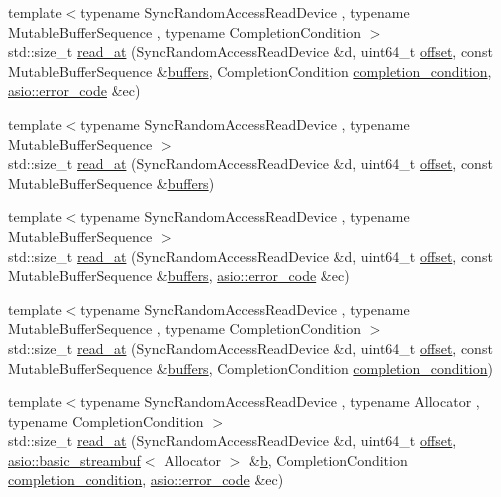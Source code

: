\begin{DoxyCompactItemize}
{\footnotesize template$<$typename Sync\+Random\+Access\+Read\+Device , typename Mutable\+Buffer\+Sequence , typename Completion\+Condition $>$ }\\std\+::size\+\_\+t \hyperlink{group__read__at_ga88604242259da9fb0bacf3c4f0cc0002}{read\+\_\+at} (Sync\+Random\+Access\+Read\+Device \&d, uint64\+\_\+t \hyperlink{group__async__read__at_ga8dcdb41a4adfd6fe5322b5dd666d9f29}{offset}, const Mutable\+Buffer\+Sequence \&\hyperlink{group__async__read_ga54dede45c3175148a77fe6635222c47d}{buffers}, Completion\+Condition \hyperlink{group__async__read_gae2e215d5013596cc2b385bb6c13fa518}{completion\+\_\+condition}, \hyperlink{classasio_1_1error__code}{asio\+::error\+\_\+code} \&ec)
\item 
{\footnotesize template$<$typename Sync\+Random\+Access\+Read\+Device , typename Mutable\+Buffer\+Sequence $>$ }\\std\+::size\+\_\+t \hyperlink{group__read__at_ga4ef7a26ff401494d673ad462a3f3f5c0}{read\+\_\+at} (Sync\+Random\+Access\+Read\+Device \&d, uint64\+\_\+t \hyperlink{group__async__read__at_ga8dcdb41a4adfd6fe5322b5dd666d9f29}{offset}, const Mutable\+Buffer\+Sequence \&\hyperlink{group__async__read_ga54dede45c3175148a77fe6635222c47d}{buffers})
\item 
{\footnotesize template$<$typename Sync\+Random\+Access\+Read\+Device , typename Mutable\+Buffer\+Sequence $>$ }\\std\+::size\+\_\+t \hyperlink{group__read__at_ga6587e766e26325457154a5dac2a0b785}{read\+\_\+at} (Sync\+Random\+Access\+Read\+Device \&d, uint64\+\_\+t \hyperlink{group__async__read__at_ga8dcdb41a4adfd6fe5322b5dd666d9f29}{offset}, const Mutable\+Buffer\+Sequence \&\hyperlink{group__async__read_ga54dede45c3175148a77fe6635222c47d}{buffers}, \hyperlink{classasio_1_1error__code}{asio\+::error\+\_\+code} \&ec)
\item 
{\footnotesize template$<$typename Sync\+Random\+Access\+Read\+Device , typename Mutable\+Buffer\+Sequence , typename Completion\+Condition $>$ }\\std\+::size\+\_\+t \hyperlink{group__read__at_gaa16ebd52ad98e521ea4b75676d4db9fd}{read\+\_\+at} (Sync\+Random\+Access\+Read\+Device \&d, uint64\+\_\+t \hyperlink{group__async__read__at_ga8dcdb41a4adfd6fe5322b5dd666d9f29}{offset}, const Mutable\+Buffer\+Sequence \&\hyperlink{group__async__read_ga54dede45c3175148a77fe6635222c47d}{buffers}, Completion\+Condition \hyperlink{group__async__read_gae2e215d5013596cc2b385bb6c13fa518}{completion\+\_\+condition})
\item 
{\footnotesize template$<$typename Sync\+Random\+Access\+Read\+Device , typename Allocator , typename Completion\+Condition $>$ }\\std\+::size\+\_\+t \hyperlink{group__read__at_ga926222f6d0bb8a716a17161a1eb725aa}{read\+\_\+at} (Sync\+Random\+Access\+Read\+Device \&d, uint64\+\_\+t \hyperlink{group__async__read__at_ga8dcdb41a4adfd6fe5322b5dd666d9f29}{offset}, \hyperlink{classasio_1_1basic__streambuf}{asio\+::basic\+\_\+streambuf}$<$ Allocator $>$ \&\hyperlink{group__async__read_ga945a5c18fa77a9e2eba420f8f44b2a4f}{b}, Completion\+Condition \hyperlink{group__async__read_gae2e215d5013596cc2b385bb6c13fa518}{completion\+\_\+condition}, \hyperlink{classasio_1_1error__code}{asio\+::error\+\_\+code} \&ec)

\end{DoxyCompactItemize}
